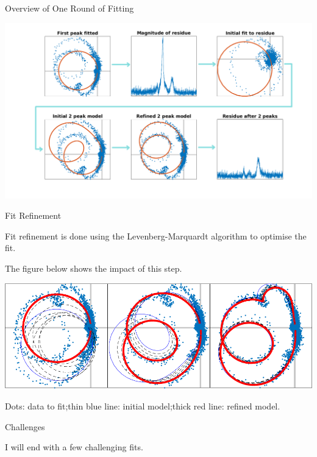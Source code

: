\documentclass[aspectratio=169, xcolor=table]{beamer}
\begin{document}
%
\begin{frame}{Overview of One Round of Fitting}

\includegraphics[width=\linewidth]{fit-and-refine.png}

\end{frame}


%
\begin{frame}{Fit Refinement}

Fit refinement is done using the Levenberg-Marquardt algorithm to optimise the
fit.

The figure below shows the impact of this step.

\medskip

\includegraphics[width=\linewidth]{fit-refine.png}

Dots: data to fit;\quad thin blue line: initial model;\quad thick red line:
refined model.

\end{frame}


%
\begin{frame}{Challenges}

I will end with a few challenging fits.

\end{frame}
\end{document}
